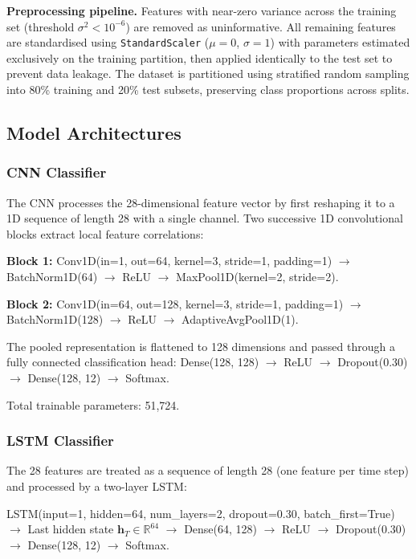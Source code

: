 \documentclass[conference]{IEEEtran}
\begin{document}
\textbf{Preprocessing pipeline.} Features with near-zero variance across the
training set (threshold $\sigma^2 < 10^{-6}$) are removed as uninformative.
All remaining features are standardised using \texttt{StandardScaler}
($\mu = 0$, $\sigma = 1$) with parameters estimated exclusively on the training
partition, then applied identically to the test set to prevent data
leakage. The dataset is partitioned using stratified random sampling into
80\% training and 20\% test subsets, preserving class proportions across splits.

\subsection{Model Architectures}
\label{ssec:architectures}

\subsubsection{CNN Classifier}

The CNN processes the 28-dimensional feature vector by first reshaping it to a
1D sequence of length 28 with a single channel. Two successive 1D convolutional
blocks extract local feature correlations:

\textbf{Block 1:} Conv1D(in=1, out=64, kernel=3, stride=1, padding=1)
$\to$ BatchNorm1D(64) $\to$ ReLU $\to$ MaxPool1D(kernel=2, stride=2).

\textbf{Block 2:} Conv1D(in=64, out=128, kernel=3, stride=1, padding=1)
$\to$ BatchNorm1D(128) $\to$ ReLU $\to$ AdaptiveAvgPool1D(1).

The pooled representation is flattened to 128 dimensions and passed through a
fully connected classification head:
Dense(128, 128) $\to$ ReLU $\to$ Dropout(0.30) $\to$ Dense(128, 12) $\to$ Softmax.

Total trainable parameters: 51,724.

\subsubsection{LSTM Classifier}

The 28 features are treated as a sequence of length 28 (one feature per time
step) and processed by a two-layer LSTM:

LSTM(input=1, hidden=64, num\_layers=2, dropout=0.30, batch\_first=True)
$\to$ Last hidden state $\mathbf{h}_T \in \mathbb{R}^{64}$
$\to$ Dense(64, 128) $\to$ ReLU $\to$ Dropout(0.30)
$\to$ Dense(128, 12) $\to$ Softmax.
\end{document}
